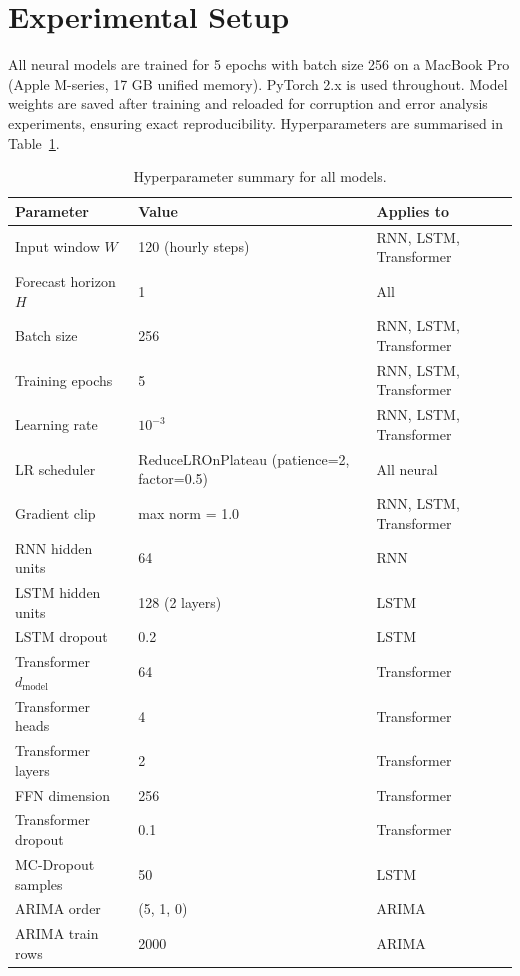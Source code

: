 \documentclass[runningheads]{llncs}
\begin{document}
\section{Experimental Setup}
\label{sec:setup}

All neural models are trained for 5 epochs with batch size 256 on a MacBook Pro (Apple M-series, 17 GB unified memory). PyTorch 2.x is used throughout. Model weights are saved after training and reloaded for corruption and error analysis experiments, ensuring exact reproducibility. Hyperparameters are summarised in Table~\ref{tab:hparams}.

\begin{table}[H]
\centering
\caption{Hyperparameter summary for all models.}
\label{tab:hparams}
\begin{tabular}{lll}
\toprule
\textbf{Parameter} & \textbf{Value} & \textbf{Applies to} \\
\midrule
Input window $W$       & 120 (hourly steps) & RNN, LSTM, Transformer \\
Forecast horizon $H$   & 1                  & All \\
Batch size             & 256                & RNN, LSTM, Transformer \\
Training epochs        & 5                  & RNN, LSTM, Transformer \\
Learning rate          & $10^{-3}$          & RNN, LSTM, Transformer \\
LR scheduler           & ReduceLROnPlateau (patience=2, factor=0.5) & All neural \\
Gradient clip          & max norm = 1.0     & RNN, LSTM, Transformer \\
RNN hidden units       & 64                 & RNN \\
LSTM hidden units      & 128 (2 layers)     & LSTM \\
LSTM dropout           & 0.2                & LSTM \\
Transformer $d_\text{model}$ & 64           & Transformer \\
Transformer heads      & 4                  & Transformer \\
Transformer layers     & 2                  & Transformer \\
FFN dimension          & 256                & Transformer \\
Transformer dropout    & 0.1                & Transformer \\
MC-Dropout samples     & 50                 & LSTM \\
ARIMA order            & (5, 1, 0)          & ARIMA \\
ARIMA train rows       & 2000               & ARIMA \\
\bottomrule
\end{tabular}
\end{table}
\end{document}
